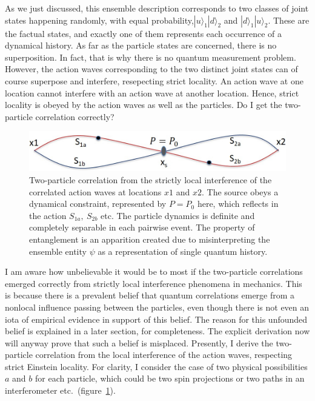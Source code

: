 As we just discussed, this ensemble description corresponds to two classes of joint states
happening randomly, with equal probability,\break $|u \rangle_1 |d \rangle_2$ and $|d \rangle_1 |u \rangle_2$. These are the factual
states, and exactly one of them represents each occurrence of a dynamical history. As far
as the particle states are concerned, there is no superposition. In fact, that is why there
is no quantum measurement problem. However, the action waves corresponding to the two
distinct joint states can of course superpose and interfere, resepecting strict locality. An
action wave at one location cannot interfere with an action wave at another location. Hence,
strict locality is obeyed by the action waves as well as the particles. Do I get the two-particle
correlation correctly?
\bigskip

\begin{figure}[H]
\centering
\includegraphics[scale=0.6]{src/images/chap27/3.jpg}
\smallskip

\caption{Two-particle correlation from the strictly local interference of the correlated action waves at
locations $x1$ and $x2$. The source obeys a dynamical constraint, represented by $P = P_0$ here, which
reflects in the action $S_{1a}, ~S_{2b}$ etc. The particle dynamics is definite and completely separable in
each pairwise event. The property of entanglement is an apparition created due to misinterpreting
the ensemble entity $\psi$ as a representation of single quantum history.}\label{ch14-fig3}
\end{figure}
\newpage

I am aware how unbelievable it would be to most if the two-particle correlations emerged
correctly from strictly local interference phenomena in mechanics. This is because there is a
prevalent belief that quantum correlations emerge from a nonlocal influence passing between
the particles, even though there is not even an iota of empirical evidence in support of this
belief. The reason for this unfounded belief is explained in a later section, for completeness.
The explicit derivation now will anyway prove that such a belief is misplaced. Presently, I
derive the two-particle correlation from the local interference of the action waves, respecting
strict Einstein locality. For clarity, I consider the case of two physical possibilities $a$ and $b$
for each particle, which could be two spin projections or two paths in an interferometer etc.\ (figure~\ref{ch14-fig3}).

